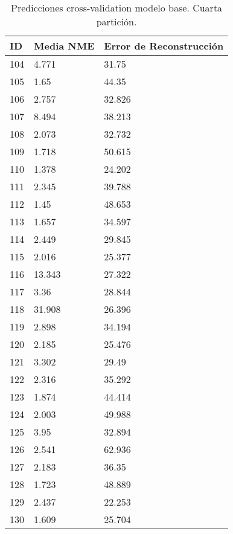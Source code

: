 \begin{table}[!ht]
    \centering
    \caption{Predicciones cross-validation modelo base. Cuarta partición.}
    \begin{tabular}{|l|l|l|}
    \hline
    \cellcolor{gray!25}\textbf{ID} & \cellcolor{gray!25}\textbf{Media NME} & \cellcolor{gray!25}\textbf{Error de Reconstrucción} \\ \hline
        104 & 4.771 & 31.75 \\ \hline
        105 & 1.65 & 44.35 \\ \hline
        106 & 2.757 & 32.826 \\ \hline
        107 & 8.494 & 38.213 \\ \hline
        108 & 2.073 & 32.732 \\ \hline
        109 & 1.718 & 50.615 \\ \hline
        110 & 1.378 & 24.202 \\ \hline
        111 & 2.345 & 39.788 \\ \hline
        112 & 1.45 & 48.653 \\ \hline
        113 & 1.657 & 34.597 \\ \hline
        114 & 2.449 & 29.845 \\ \hline
        115 & 2.016 & 25.377 \\ \hline
        116 & 13.343 & 27.322 \\ \hline
        117 & 3.36 & 28.844 \\ \hline
        118 & 31.908 & 26.396 \\ \hline
        119 & 2.898 & 34.194 \\ \hline
        120 & 2.185 & 25.476 \\ \hline
        121 & 3.302 & 29.49 \\ \hline
        122 & 2.316 & 35.292 \\ \hline
        123 & 1.874 & 44.414 \\ \hline
        124 & 2.003 & 49.988 \\ \hline
        125 & 3.95 & 32.894 \\ \hline
        126 & 2.541 & 62.936 \\ \hline
        127 & 2.183 & 36.35 \\ \hline
        128 & 1.723 & 48.889 \\ \hline
        129 & 2.437 & 22.253 \\ \hline
        130 & 1.609 & 25.704 \\ \hline
    \end{tabular}
\end{table}
\endinput
